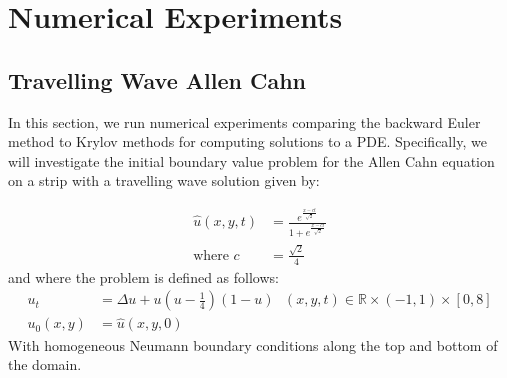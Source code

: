 \section{Numerical Experiments}

\subsection{Travelling Wave Allen Cahn}
In this section, we run numerical experiments comparing the backward Euler method to Krylov methods for computing solutions to a PDE.
Specifically, we will investigate the initial boundary value problem for the Allen Cahn equation on a strip with a travelling wave solution\cite{YukitakaFukao2004} given by:

\begin{align*}
    \hat u(x,y,t)&=\frac{e^{\frac{x-ct}{\sqrt2}}}{1+e^{\frac{x-ct}{\sqrt2}}} \label{TravellingWaveSol}\\
    \text{where } c &= \frac{\sqrt{2}}{4}
\end{align*}
and where the problem is defined as follows:
\begin{align*}
    u_t&=\Delta u+u(u-\frac14)(1-u) \text{ $(x,y,t)\in \mathbb{R} \times (-1,1) \times [0, 8]$}\\
    u_0(x, y) &= \hat u(x,y, 0)
\end{align*}
With homogeneous Neumann boundary conditions along the top and bottom of the domain.

